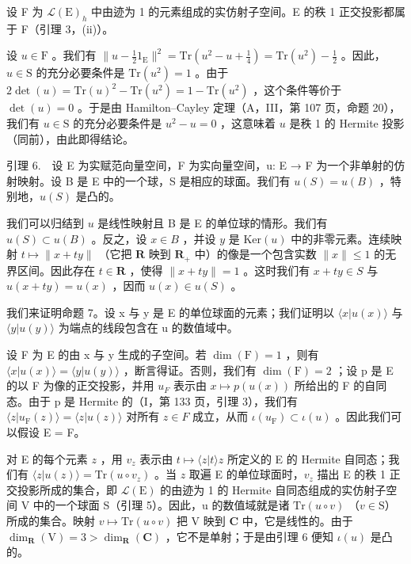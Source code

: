 设 F 为 \(\mathcal{L}(\mathrm{E})_h\) 中由迹为 1 的元素组成的实仿射子空间。E 的秩 1 正交投影都属于 F（引理 3，(ii)）。

设 \(u \in \mathrm{F}\) 。我们有 \(\| u - \frac{1}{2} 1_{\mathrm{E}} \|^{2} = \mathrm{Tr}(u^{2} - u + \frac{1}{4}) = \mathrm{Tr}(u^{2}) - \frac{1}{2}\) 。因此，\(u \in \mathrm{S}\) 的充分必要条件是 \(\mathrm{Tr}(u^{2}) = 1\) 。由于 \(2\det(u) = \mathrm{Tr}(u)^{2} - \mathrm{Tr}(u^{2}) = 1 - \mathrm{Tr}(u^{2})\) ，这个条件等价于 \(\det(u) = 0\) 。于是由 Hamilton–Cayley 定理（A，III，第 107 页，命题 20），我们有 \(u \in \mathrm{S}\) 的充分必要条件是 \(u^{2} - u = 0\) ，这意味着 \(u\) 是秩 1 的 Hermite 投影（同前），由此即得结论。

引理 6.　设 E 为实赋范向量空间，F 为实向量空间，u: E → F 为一个非单射的仿射映射。设 B 是 E 中的一个球，S 是相应的球面。我们有 \(u(S) = u(B)\) ，特别地，\(u(S)\) 是凸的。

我们可以归结到 \(u\) 是线性映射且 B 是 E 的单位球的情形。我们有 \(u(S) \subset u(B)\) 。反之，设 \(x \in B\) ，并设 \(y\) 是 \(\text{Ker}(u)\) 中的非零元素。连续映射 \(t \mapsto \|x + ty\|\) （它把 \(\mathbf{R}\) 映到 \(\mathbf{R}_+\) 中）的像是一个包含实数 \(\|x\| \leqslant 1\) 的无界区间。因此存在 \(t \in \mathbf{R}\) ，使得 \(\|x + ty\| = 1\) 。这时我们有 \(x + ty \in S\) 与 \(u(x + ty) = u(x)\) ，因而 \(u(x) \in u(S)\) 。

我们来证明命题 7。设 x 与 y 是 E 的单位球面的元素；我们证明以 \(\langle x|u(x)\rangle\) 与 \(\langle y|u(y)\rangle\) 为端点的线段包含在 u 的数值域中。

设 F 为 E 的由 x 与 y 生成的子空间。若 \(\dim(\mathrm{F}) = 1\) ，则有 \(\langle x|u(x)\rangle = \langle y|u(y)\rangle\) ，断言得证。否则，我们有 \(\dim(\mathrm{F}) = 2\) ；设 p 是 E 的以 F 为像的正交投影，并用 \(u_{F}\) 表示由 \(x \mapsto p(u(x))\) 所给出的 F 的自同态。由于 p 是 Hermite 的（I，第 133 页，引理 3），我们有 \(\langle z|u_{\mathrm{F}}(z)\rangle = \langle z|u(z)\rangle\) 对所有 \(z \in F\) 成立，从而 \(\iota(u_{\mathrm{F}}) \subset \iota(u)\) 。因此我们可以假设 E = F。

对 E 的每个元素 \(z\) ，用 \(v_{z}\) 表示由 \(t \mapsto \langle z|t\rangle z\) 所定义的 E 的 Hermite 自同态；我们有 \(\langle z|u(z)\rangle = \mathrm{Tr}(u \circ v_{z})\) 。当 \(z\) 取遍 E 的单位球面时，\(v_{z}\) 描出 E 的秩 1 正交投影所成的集合，即 \(\mathcal{L}(\mathrm{E})\) 的由迹为 1 的 Hermite 自同态组成的实仿射子空间 V 中的一个球面 S（引理 5）。因此，u 的数值域就是诸 \(\mathrm{Tr}(u \circ v)\) （\(v \in \mathrm{S}\)）所成的集合。映射 \(v \mapsto \mathrm{Tr}(u \circ v)\) 把 V 映到 \(\mathbf{C}\) 中，它是线性的。由于 \(\dim_{\mathbf{R}}(\mathrm{V}) = 3 > \dim_{\mathbf{R}}(\mathbf{C})\) ，它不是单射；于是由引理 6 便知 \(\iota(u)\) 是凸的。

